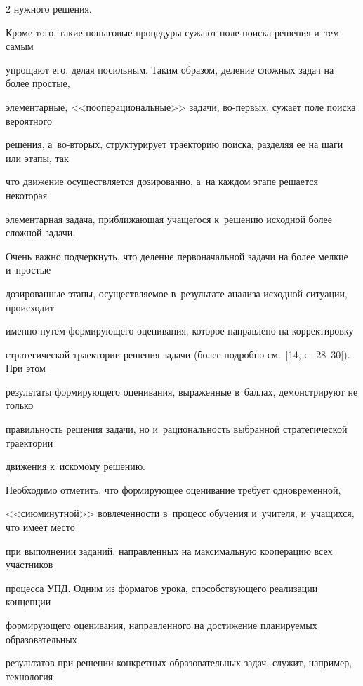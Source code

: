\begin{multicols}{2}
нужного решения.





  Кроме того, такие пошаговые процедуры сужают поле поиска решения и~тем самым


упрощают его, делая посильным. Таким образом, деление сложных задач на более простые,


элементарные, <<пооперациональные>> задачи, во-пер\-вых, сужает поле поиска вероятного


решения, а~во-вто\-рых, структурирует траекторию поиска, разделяя ее на шаги или этапы, так


что движение осуществляется дозированно, а~на каждом этапе решается некоторая


элементарная задача, приближающая учащегося к~решению исходной более сложной задачи.





  Очень важно подчеркнуть, что деление первоначальной задачи на более мелкие и~простые


дозированные этапы, осуществляемое в~результате анализа исходной ситуации, происходит


именно \mbox{путем} формирующего оценивания, которое на\-прав\-ле\-но на корректировку


стратегической траектории решения задачи (более подробно см.~[14, с.~28--30]). При этом


результаты формирующего оценивания, выраженные в~баллах, демонстрируют не только


правильность решения задачи, но и~рациональность выбранной стратегической траектории


движения к~искомому решению.





  Необходимо отметить, что формирующее оценивание требует одновременной,


<<сиюминутной>> вовлеченности в~процесс обучения и~учителя, и~учащихся, что имеет место


при выполнении заданий, направленных на максимальную кооперацию всех участников


процесса УПД. Одним из форматов урока, способствующего реализации концепции


формирующего оценивания, направленного на достижение планируемых образовательных


результатов при решении конкретных образовательных задач, служит, например, технология



\end{multicols}
